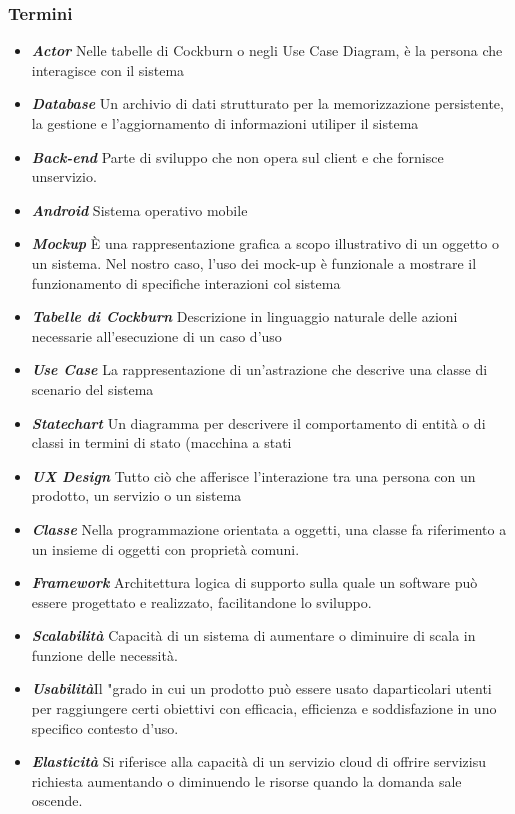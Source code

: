 \documentclass{article}
\begin{document}
			\subsubsection{Termini}
			\begin{itemize}
				\item \textbf{\textit{\textcolor{dark_purple}{Actor}}} Nelle tabelle di Cockburn o negli Use Case Diagram, è la persona che interagisce con il sistema
				\item \textbf{\textit{\textcolor{dark_purple}{Database}}} Un archivio di dati strutturato per la memorizzazione persistente, la gestione e l’aggiornamento di informazioni utiliper il sistema
				\item \textbf{\textit{\textcolor{dark_purple}{Back-end}}} Parte di sviluppo che non opera sul client e che fornisce unservizio.
				\item \textbf{\textit{\textcolor{dark_purple}{Android}}} Sistema operativo mobile
				\item \textbf{\textit{\textcolor{dark_purple}{Mockup}}} È una rappresentazione grafica a scopo illustrativo di un oggetto o un sistema. Nel nostro caso, l’uso dei mock-up è funzionale a mostrare il funzionamento di specifiche interazioni col sistema
				\item \textbf{\textit{\textcolor{dark_purple}{Tabelle di Cockburn}}} Descrizione in linguaggio naturale delle azioni necessarie all’esecuzione di un caso d’uso
				\item \textbf{\textit{\textcolor{dark_purple}{Use Case}}} La rappresentazione di un’astrazione che descrive una classe di scenario del sistema
				\item \textbf{\textit{\textcolor{dark_purple}{Statechart}}} Un diagramma per descrivere il comportamento di entità o di classi in termini di stato (macchina a stati
				\item \textbf{\textit{\textcolor{dark_purple}{UX Design}}} Tutto ciò che afferisce l’interazione tra una persona con un prodotto, un servizio o un sistema
				\item \textbf{\textit{\textcolor{dark_purple}{Classe}}} Nella programmazione orientata a oggetti, una classe fa riferimento a un insieme di oggetti con proprietà comuni.
				\item \textbf{\textit{\textcolor{dark_purple}{Framework}}} Architettura logica di supporto sulla quale un software può essere progettato e realizzato, facilitandone lo sviluppo.
				\item \textbf{\textit{\textcolor{dark_purple}{Scalabilità}}} Capacità di un sistema di aumentare o diminuire di scala in funzione delle necessità.
				\item \textbf{\textit{\textcolor{dark_purple}{Usabilità}}}Il "grado in cui un prodotto può essere usato daparticolari utenti per raggiungere certi obiettivi con efficacia, efficienza e soddisfazione in uno specifico contesto d’uso.
				\item \textbf{\textit{\textcolor{dark_purple}{Elasticità}}} Si riferisce alla capacità di un servizio cloud di offrire servizisu richiesta aumentando o diminuendo le risorse quando la domanda sale oscende.
			\end{itemize}
\end{document}
